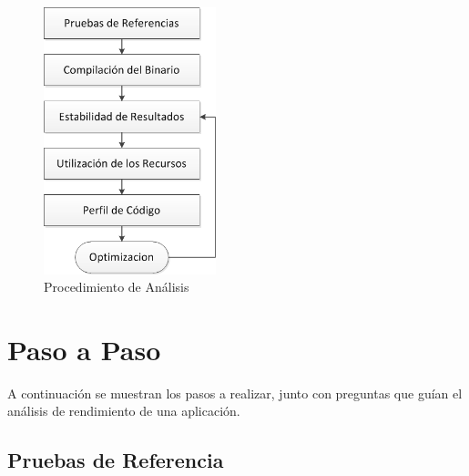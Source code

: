 \documentclass[a4paper]{report}
\begin{document}
\begin{figure}[H]
\label{fig:procedure}
\centering
\includegraphics[width=5cm]{procedure.png}
\caption{Procedimiento de Análisis}
\end{figure}

\section{Paso a Paso}

A continuación se muestran los pasos a realizar, junto con preguntas que guían el análisis de rendimiento de una aplicación.

\subsection{Pruebas de Referencia}
\end{document}

